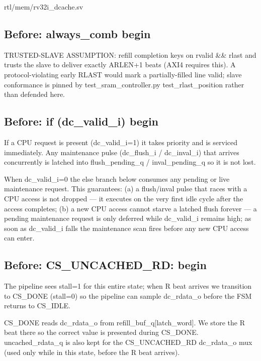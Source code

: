 \begin{relocated}{rtl/mem/rv32i_dcache.sv}

\subsection*{Before: always\_comb begin}

\begin{textblock}
  TRUSTED-SLAVE ASSUMPTION: refill completion keys on rvalid && rlast and
  trusts the slave to deliver exactly ARLEN+1 beats (AXI4 requires this).
  A protocol-violating early RLAST would mark a partially-filled line
  valid; slave conformance is pinned by test_sram_controller.py
  test_rlast_position rather than defended here.
\end{textblock}

\subsection*{Before: if (dc\_valid\_i) begin}

\begin{textblock}
If a CPU request is present (dc_valid_i=1) it takes priority and
is serviced immediately.  Any maintenance pulse (dc_flush_i /
dc_inval_i) that arrives concurrently is latched into
flush_pending_q / inval_pending_q so it is not lost.

When dc_valid_i=0 the else branch below consumes any pending or
live maintenance request.  This guarantees:
  (a) a flush/inval pulse that races with a CPU access is not
      dropped — it executes on the very first idle cycle after
      the access completes;
  (b) a new CPU access cannot starve a latched flush forever —
      a pending maintenance request is only deferred while
      dc_valid_i remains high; as soon as dc_valid_i falls the
      maintenance scan fires before any new CPU access can enter.
\end{textblock}

\subsection*{Before: CS\_UNCACHED\_RD: begin}

\begin{textblock}
  The pipeline sees stall=1 for this entire state; when R beat
  arrives we transition to CS_DONE (stall=0) so the pipeline can
  sample dc_rdata_o before the FSM returns to CS_IDLE.

CS_DONE reads dc_rdata_o from refill_buf_q[latch_word].  We store
the R beat there so the correct value is presented during CS_DONE.
uncached_rdata_q is also kept for the CS_UNCACHED_RD dc_rdata_o mux
(used only while in this state, before the R beat arrives).
\end{textblock}


\end{relocated}
